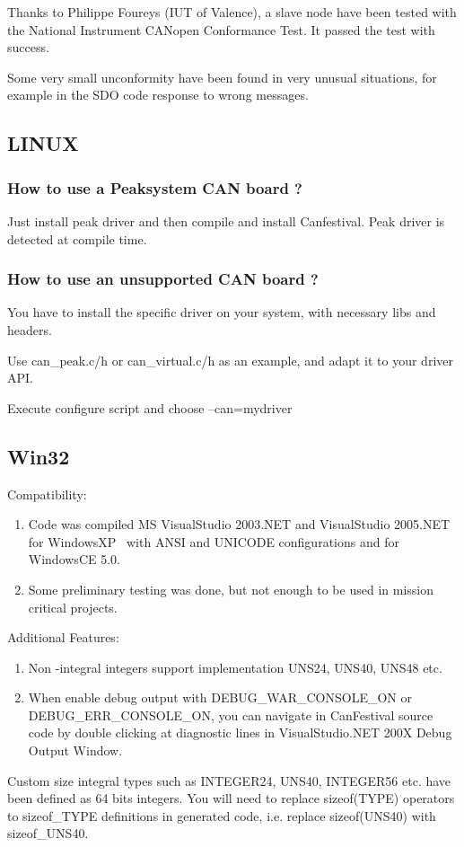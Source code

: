 \documentclass[12pt,english,a4paper]{book}
\newcommand{\canopen}{CANopen }
\begin{document}
Thanks to Philippe Foureys (IUT of Valence), a slave node have been
tested with the National Instrument \canopen Conformance Test. It
passed the test with success.

Some very small unconformity have been found in very unusual situations,
for example in the SDO code response to wrong messages.


\subsection{LINUX}


\subsubsection{How to use a Peaksystem CAN board ?}

Just install peak driver and then compile and install Canfestival.
Peak driver is detected at compile time.


\subsubsection{How to use an unsupported CAN board ?}

You have to install the specific driver on your system, with necessary
libs and headers.

Use can\_peak.c/h or can\_virtual.c/h as an example, and adapt it
to your driver API.

Execute configure script and choose --can=mydriver


\subsection{Win32}

Compatibility:

\begin{enumerate}
\item Code was compiled MS VisualStudio 2003.NET and VisualStudio 2005.NET
for WindowsXP \ with ANSI and UNICODE configurations and for WindowsCE
5.0. 
\item Some preliminary testing was done, but not enough to be used in mission
critical projects. 
\end{enumerate}
Additional Features:

\begin{enumerate}
\item Non -integral integers support implementation UNS24, UNS40, UNS48
etc. 
\item When enable debug output with DEBUG\_WAR\_CONSOLE\_ON or DEBUG\_ERR\_CONSOLE\_ON,
you can navigate in CanFestival source code by double clicking at
diagnostic lines in VisualStudio.NET 200X Debug Output Window. 
\end{enumerate}
Custom size integral types such as INTEGER24, UNS40, INTEGER56 etc.
have been defined as 64 bits integers. You will need to replace sizeof(TYPE)
operators to sizeof\_TYPE definitions in generated code, i.e. replace
sizeof(UNS40) with sizeof\_UNS40.
\end{document}
